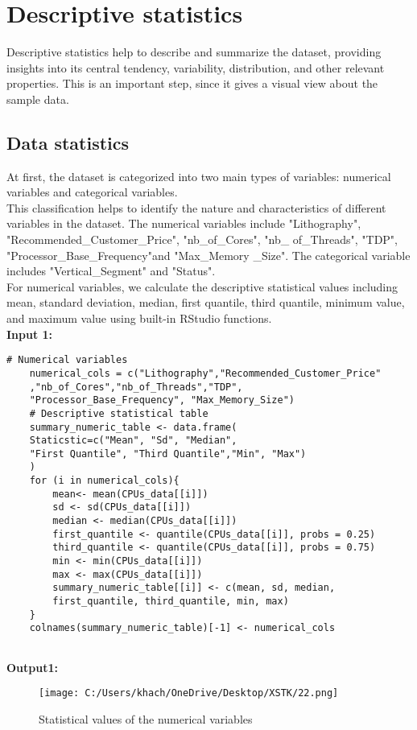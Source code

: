\documentclass[a4paper]{article}
\begin{document}
	\section{Descriptive statistics}
	Descriptive statistics help to describe and summarize the dataset, providing insights into its central tendency, variability, distribution, and other relevant properties. This is an important step, since it gives a visual view about the sample data.
	\subsection{Data statistics}
	At first, the dataset is categorized into two main types of variables: numerical variables and categorical variables. \\
	This classification helps to identify the nature and characteristics of different variables in the dataset. The numerical variables include "Lithography", "Recommended\_Customer\_Price", "nb\_of\_Cores", "nb\_ of\_Threads", "TDP", "Processor\_Base\_Frequency"and "Max\_Memory \_Size". The categorical variable includes "Vertical\_Segment" and "Status".\\
	For numerical variables, we calculate the descriptive statistical values including mean, standard deviation, median, first quantile, third quantile, minimum value, and maximum value using built-in RStudio functions.\\
	\textbf{Input 1:}
	\begin{lstlisting}[frame=single, backgroundcolor=\color{gray!10}, breaklines=true, columns=fullflexible]
	# Numerical variables
	numerical_cols = c("Lithography","Recommended_Customer_Price"
	,"nb_of_Cores","nb_of_Threads","TDP", 
	"Processor_Base_Frequency", "Max_Memory_Size")
	# Descriptive statistical table
	summary_numeric_table <- data.frame(
	Staticstic=c("Mean", "Sd", "Median", 
	"First Quantile", "Third Quantile","Min", "Max")
	)
	for (i in numerical_cols){
		mean<- mean(CPUs_data[[i]])
		sd <- sd(CPUs_data[[i]])
		median <- median(CPUs_data[[i]])
		first_quantile <- quantile(CPUs_data[[i]], probs = 0.25)
		third_quantile <- quantile(CPUs_data[[i]], probs = 0.75)
		min <- min(CPUs_data[[i]])
		max <- max(CPUs_data[[i]])
		summary_numeric_table[[i]] <- c(mean, sd, median, 
		first_quantile, third_quantile, min, max)
	}
	colnames(summary_numeric_table)[-1] <- numerical_cols
	
	\end{lstlisting}
	\textbf{Output1:}
	\begin{figure}[htbp]
		\centering
		\begin{adjustbox}{width=1\textwidth, frame}
			\texttt{[image: C:/Users/khach/OneDrive/Desktop/XSTK/22.png]}
		\end{adjustbox}
		\captionsetup{justification=centering}
		\vspace{0.5cm}
		\caption{Statistical values of the numerical variables}
	\end{figure}
\end{document}
